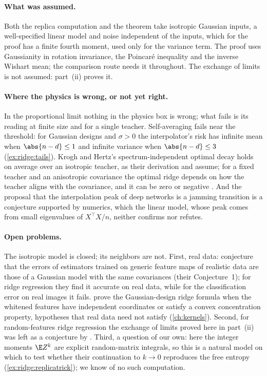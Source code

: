 \begin{refsection}
\paragraph{What was assumed.} Both the replica computation and the theorem take isotropic Gaussian inputs, a well-specified linear model and noise independent of the inputs, which for the proof has a finite fourth moment, used only for the variance term. The proof uses Gaussianity in rotation invariance, the Poincaré inequality and the inverse Wishart mean; the comparison route needs it throughout. The exchange of limits is not assumed: part~(ii) proves it.

\paragraph{Where the physics is wrong, or not yet right.} In the proportional limit nothing in the physics box is wrong; what fails is its reading at finite size and for a single teacher. Self-averaging fails near the threshold: for Gaussian designs and $\sigma>0$ the interpolator's risk has infinite mean when $\abs{n-d}\le1$ and infinite variance when $\abs{n-d}\le3$ (\cref{ex:ridge:tails}). Krogh and Hertz's spectrum-independent optimal decay holds on average over an isotropic teacher, as their derivation and \textcite{DobribanWager2018} assume; for a fixed teacher and an anisotropic covariance the optimal ridge depends on how the teacher aligns with the covariance, and it can be zero or negative \parencite{KobakEtAl2020}. And the proposal that the interpolation peak of deep networks is a jamming transition \parencite{SpiglerEtAl2019,GeigerEtAl2019} is a conjecture supported by numerics, which the linear model, whose peak comes from small eigenvalues of $X^\top X/n$, neither confirms nor refutes.

\paragraph{Open problems.} The isotropic model is closed; its neighbors are not. First, real data: \textcite{LoureiroEtAl2022} conjecture that the errors of estimators trained on generic feature maps of realistic data are those of a Gaussian model with the same covariances (their Conjecture~1); for ridge regression they find it accurate on real data, while for the classification error on real images it fails. \textcite{ChengMontanari2024} prove the Gaussian-design ridge formula when the whitened features have independent coordinates or satisfy a convex concentration property, hypotheses that real data need not satisfy (\cref{ch:kernels}). Second, for random-features ridge regression the exchange of limits proved here in part~(ii) was left as a conjecture by \textcite[Remark~1]{MeiMontanari2022}. Third, a question of our own: here the integer moments $\E Z^k$ are explicit random-matrix integrals, so this is a natural model on which to test whether their continuation to $k\to0$ reproduces the free entropy (\cref{ex:ridge:replicatrick}); we know of no such computation.


\end{refsection}
